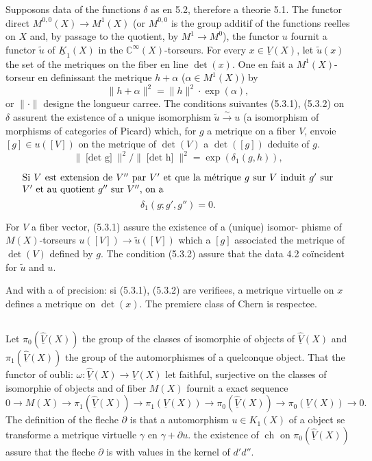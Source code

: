 \documentclass[12pt,a4paper]{article}
\theoremstyle{plain}
\theoremstyle{definition}
\DeclareMathOperator{\ch}{ch}
\newcommand{\CC}{\mathbb{C}}
\begin{document}
Supposons data of the functions $\delta$ as en 5.2, therefore a theorie 5.1.
The functor direct $M^{0,0}(X) \to M^1(X)$ (or $M^{0,0}$ is the group additif of the functions reelles
on $X$ and, by passage to the quotient, by $M^1 \to M^0$), the functor $u$ fournit a
functor $\tilde{u}$ of $\underline{K}_1(X)$ in the $\CC^\infty(X)$-torseurs. For every $x \in \underline{V}(X)$, let
$\tilde{u}(x)$ the set of the metriques on the fiber en line $\det(x)$. One en fait a
$M^1(X)$-torseur en definissant the metrique $h + \alpha$ ($\alpha \in M^1(X)$) by
\[
\|h + \alpha\|^2 = \|h\|^2 \cdot \exp(\alpha) ,
\]
or $\|\cdot\|$ designe the longueur carree. The conditions suivantes (5.3.1), (5.3.2)
on $\delta$ assurent the existence of a unique isomorphism $\tilde{u} \xrightarrow{\sim} u$ (a isomorphism
of morphisms of categories of Picard) which, for $g$ a metrique on a fiber
$V$, envoie $[g] \in u([V])$ on the metrique of $\det(V)$ a $\det([g])$ deduite of $g$.
\begin{equation}\label{eq:5.3.1}
\|\textrm{[$\det$ g]}\|^2 / \|\textrm{[$\det$ h]}\|^2 = \exp(\delta_1(g, h)),
\end{equation}

\begin{equation}\label{eq:5.3.2}
\parbox{\dimexpr\linewidth-2em}{%
Si $V$ est extension de $V''$ par $V'$ et que la m\'etrique $g$ sur $V$
induit $g'$ sur $V'$ et au quotient $g''$ sur $V''$, on a}
\end{equation}
\[
\delta_1(g; g', g'') = 0 .
\]

For $V$ a fiber vector, (5.3.1) assure the existence of a (unique) isomor-
phisme of $M(X)$-torseurs $u([V]) \to \tilde{u}([V])$ which a $[g]$ associated the metrique of
$\det(V)$ defined by $g$. The condition (5.3.2) assure that the data 4.2 co\"incident
for $\tilde{u}$ and $u$.

And with a of precision: si (5.3.1), (5.3.2) are verifiees, a metrique
virtuelle on $x$ defines a metrique on $\det(x)$. The premiere class of Chern
is respectee.

\subsection{}

Let $\pi_0(\widehat{\underline{V}}(X))$ the group of the classes of isomorphie of objects of
$\widehat{\underline{V}}(X)$ and $\pi_1(\widehat{\underline{V}}(X))$ the group of the automorphismes of a quelconque object. That the
functor of oubli: $\omega: \widehat{\underline{V}}(X) \to \underline{V}(X)$ let faithful, surjective on the classes of isomorphie
of objects and of fiber $M(X)$ fournit a exact sequence
\begin{equation}\label{eq:5.4.1}
0 \to M(X) \to \pi_1(\widehat{\underline{V}}(X)) \to \pi_1(\underline{V}(X)) \to \pi_0(\widehat{\underline{V}}(X)) \to \pi_0(\underline{V}(X)) \to 0 .
\end{equation}
The definition of the fleche $\partial$ is that a automorphism $u \in K_1(X)$ of a object se transforme a metrique
virtuelle $\gamma$ en $\gamma + \partial u$. the existence of $\ch$ on $\pi_0(\widehat{\underline{V}}(X))$ assure that the fleche
$\partial$ is with values in the kernel of $d'd''$.
\end{document}
